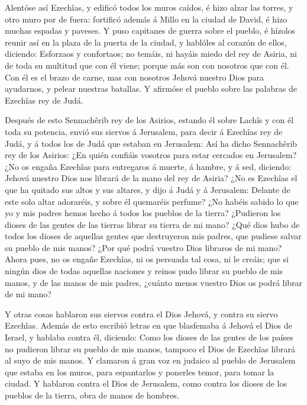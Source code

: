  Alentóse así Ezechîas, y edificó todos los muros caídos, é
hizo alzar las torres, y otro muro por de fuera: fortificó además á
Millo en la ciudad de David, é hizo muchas espadas y paveses.
 Y puso capitanes de guerra sobre el pueblo, é hízolos
reunir así en la plaza de la puerta de la ciudad, y hablóles al corazón
de ellos, diciendo:  Esforzaos y confortaos; no temáis, ni
hayáis miedo del rey de Asiria, ni de toda su multitud que con él viene;
porque más son con nosotros que con él.  Con él es el brazo
de carne, mas con nosotros Jehová nuestro Dios para ayudarnos, y pelear
nuestras batallas. Y afirmóse el pueblo sobre las palabras de Ezechîas
rey de Judá.

 Después de esto Sennachêrib rey de los Asirios, estando él
sobre Lachîs y con él toda su potencia, envió sus siervos á Jerusalem,
para decir á Ezechîas rey de Judá, y á todos los de Judá que estaban en
Jerusalem:  Así ha dicho Sennachêrib rey de los Asirios:
¿En quién confiáis vosotros para estar cercados en Jerusalem?
 ¿No os engaña Ezechîas para entregaros á muerte, á hambre,
y á sed, diciendo: Jehová nuestro Dios nos librará de la mano del rey de
Asiria?  ¿No es Ezechîas el que ha quitado sus altos y sus
altares, y dijo á Judá y á Jerusalem: Delante de este solo altar
adoraréis, y sobre él quemaréis perfume?  ¿No habéis sabido
lo que yo y mis padres hemos hecho á todos los pueblos de la tierra?
¿Pudieron los dioses de las gentes de las tierras librar su tierra de mi
mano?  ¿Qué dios hubo de todos los dioses de aquellas
gentes que destruyeron mis padres, que pudiese salvar su pueblo de mis
manos? ¿Por qué podrá vuestro Dios libraros de mi mano? 
Ahora pues, no os engañe Ezechîas, ni os persuada tal cosa, ni le
creáis; que si ningún dios de todas aquellas naciones y reinos pudo
librar su pueblo de mis manos, y de las manos de mis padres, ¿cuánto
menos vuestro Dios os podrá librar de mi mano?

 Y otras cosas hablaron sus siervos contra el Dios Jehová,
y contra su siervo Ezechîas.  Además de esto escribió
letras en que blasfemaba á Jehová el Dios de Israel, y hablaba contra
él, diciendo: Como los dioses de las gentes de los países no pudieron
librar su pueblo de mis manos, tampoco el Dios de Ezechîas librará al
suyo de mis manos.  Y clamaron á gran voz en judaico al
pueblo de Jerusalem que estaba en los muros, para espantarlos y ponerles
temor, para tomar la ciudad.  Y hablaron contra el Dios de
Jerusalem, como contra los dioses de los pueblos de la tierra, obra de
manos de hombres.

